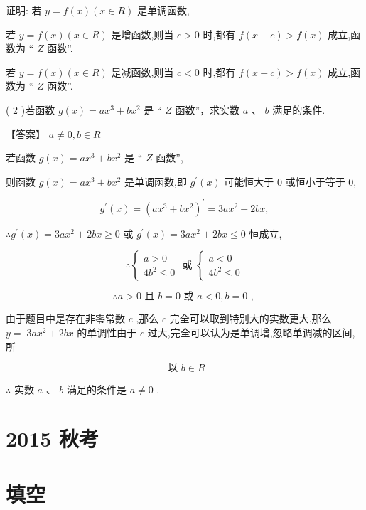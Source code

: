 \documentclass[10pt]{article}
\begin{document}
证明: 若 \(y = f\left( x\right) \left( {x \in  R}\right)\) 是单调函数,

若 \(y = f\left( x\right) \left( {x \in  R}\right)\) 是增函数,则当 \(c > 0\) 时,都有 \(f\left( {x + c}\right)  > f\left( x\right)\) 成立,函数为 “ \(Z\) 函数”.

若 \(y = f\left( x\right) \left( {x \in  R}\right)\) 是减函数,则当 \(c < 0\) 时,都有 \(f\left( {x + c}\right)  > f\left( x\right)\) 成立,函数为 “ \(Z\) 函数”.

( 2 )若函数 \(g\left( x\right)  = a{x}^{3} + b{x}^{2}\) 是 “ \(Z\) 函数”，求实数 \(a\) 、 \(b\) 满足的条件.

【答案】 \(a \neq  0,b \in  R\)

若函数 \(g\left( x\right)  = a{x}^{3} + b{x}^{2}\) 是 “ \(Z\) 函数”,

则函数 \(g\left( x\right)  = a{x}^{3} + b{x}^{2}\) 是单调函数,即 \({g}^{\prime }\left( x\right)\) 可能恒大于 0 或恒小于等于 0,

\[
{g}^{\prime }\left( x\right)  = {\left( a{x}^{3} + b{x}^{2}\right) }^{\prime } = {3a}{x}^{2} + {2bx},
\]

\(\therefore {g}^{\prime }\left( x\right)  = {3a}{x}^{2} + {2bx} \geq  0\) 或 \({g}^{\prime }\left( x\right)  = {3a}{x}^{2} + {2bx} \leq  0\) 恒成立,

\[
\therefore \left\{  \begin{array}{l} a > 0 \\  4{b}^{2} \leq  0 \end{array}\right. \text{ 或 }\left\{  \begin{array}{l} a < 0 \\  4{b}^{2} \leq  0 \end{array}\right.
\]

\[
\therefore a > 0\text{ 且 }b = 0\text{ 或 }a < 0,b = 0\text{ , }
\]

由于题目中是存在非零常数 \(c\) ,那么 \(c\) 完全可以取到特别大的实数更大,那么 \(y = \; {3a}{x}^{2} + {2bx}\) 的单调性由于 \(c\) 过大,完全可以认为是单调增,忽略单调减的区间,所

\[
\text{ 以 }b \in  R
\]

\(\therefore\) 实数 \(a\text{ 、 }b\) 满足的条件是 \(a \neq  0\) .

\section*{2015 秋考}

\section*{填空}
\end{document}
